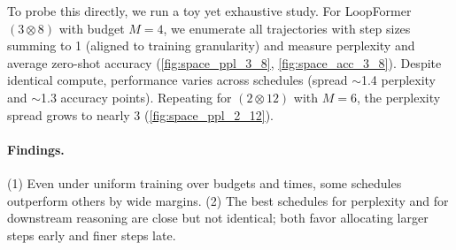 To probe this directly, we run a toy yet exhaustive study. For LoopFormer $(3\otimes8)$ with budget $M=4$, we enumerate all trajectories with step sizes summing to 1 (aligned to training granularity) and measure perplexity and average zero-shot accuracy (\autoref{fig:space_ppl_3_8}, \autoref{fig:space_acc_3_8}). Despite identical compute, performance varies across schedules (spread $\sim$1.4 perplexity and $\sim$1.3 accuracy points). Repeating for $(2\otimes12)$ with $M=6$, the perplexity spread grows to nearly 3 (\autoref{fig:space_ppl_2_12}).


\paragraph{Findings.}
(1) Even under uniform training over budgets and times, some schedules outperform others by wide margins.  
(2) The best schedules for perplexity and for downstream reasoning are close but not identical; both favor allocating larger steps early and finer steps late.
